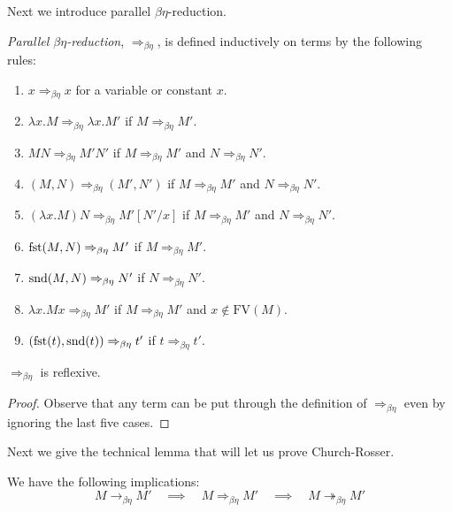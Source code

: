 Next we introduce parallel $\beta \eta$-reduction.

\begin{defin}
    \emph{Parallel $\beta\eta$-reduction}, $\Rightarrow_{\beta\eta}$, is defined inductively on terms by the following rules:
    \begin{enumerate}
        \item $x \Rightarrow_{\beta\eta} x$ for a variable or constant $x$.
        \item $\lambda x . M \Rightarrow_{\beta\eta} \lambda x . M'$ if $M \Rightarrow_{\beta\eta} M'$.
        \item $M N \Rightarrow_{\beta\eta} M' N'$ if $M \Rightarrow_{\beta\eta} M'$ and $N \Rightarrow_{\beta\eta} N'$.
        \item $(M, N) \Rightarrow_{\beta\eta} (M', N')$ if $M \Rightarrow_{\beta\eta} M'$ and $N \Rightarrow_{\beta\eta} N'$.
        \item $(\lambda x . M) N \Rightarrow_{\beta\eta} M '[N'/x]$ if $M \Rightarrow_{\beta\eta} M'$ and $N \Rightarrow_{\beta\eta} N'$.
        \item $\mathrm{fst}(M, N) \Rightarrow_{\beta\eta} M'$ if $M \Rightarrow_{\beta\eta} M'$.
        \item $\mathrm{snd}(M, N) \Rightarrow_{\beta\eta} N'$ if $N \Rightarrow_{\beta\eta} N'$.
        \item $\lambda x . M x \Rightarrow_{\beta\eta}M'$ if $M \Rightarrow_{\beta\eta} M'$ and $x \not \in \mathrm{FV}(M)$.
        \item $(\mathrm{fst} (t), \mathrm{snd}(t)) \Rightarrow_{\beta\eta} t'$ if $t \Rightarrow_{\beta\eta} t'$.
    \end{enumerate}
\end{defin}

\begin{cor}\label{beta_eta_par_refl}
    $\Rightarrow_{\beta\eta}$ is reflexive.
\end{cor}

\begin{proof}
    Observe that any term can be put through the definition of $\Rightarrow_{\beta\eta}$ even by ignoring the last five cases.
\end{proof}

Next we give the technical lemma that will let us prove Church-Rosser.

\begin{lemma}\label{beta_eta_par_imp}
    We have the following implications:
    $$
        M \to_{\beta\eta} M' \quad \implies \quad M \Rightarrow_{\beta\eta} M' \quad \implies \quad M \twoheadrightarrow_{\beta\eta} M'
    $$
\end{lemma}

